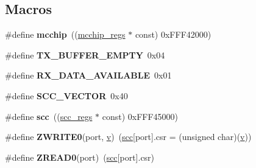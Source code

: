 \subsection*{Macros}
\begin{DoxyCompactItemize}
\item 
\mbox{\label{group__RTEMSBSPsM68kMVME162_gadb6901376d3135ebb6c13cdcbd141252}} 
\#define {\bfseries mcchip}~((\mbox{\hyperlink{structmcchip__regs}{mcchip\+\_\+regs}} $\ast$ const) 0x\+F\+F\+F42000)
\item 
\mbox{\label{group__RTEMSBSPsM68kMVME162_ga17ba25b8b713d14f21883e8e8c801075}} 
\#define {\bfseries T\+X\+\_\+\+B\+U\+F\+F\+E\+R\+\_\+\+E\+M\+P\+TY}~0x04
\item 
\mbox{\label{group__RTEMSBSPsM68kMVME162_ga2c89e28d132bac383f72403e1e62135b}} 
\#define {\bfseries R\+X\+\_\+\+D\+A\+T\+A\+\_\+\+A\+V\+A\+I\+L\+A\+B\+LE}~0x01
\item 
\mbox{\label{group__RTEMSBSPsM68kMVME162_ga3845de4996526e018ce7bfd88f92fbf9}} 
\#define {\bfseries S\+C\+C\+\_\+\+V\+E\+C\+T\+OR}~0x40
\item 
\mbox{\label{group__RTEMSBSPsM68kMVME162_gad654dc9ea6a06d25ae4b6fb1e9837d58}} 
\#define {\bfseries scc}~((\mbox{\hyperlink{structscc__regs}{scc\+\_\+regs}} $\ast$ const) 0x\+F\+F\+F45000)
\item 
\mbox{\label{group__RTEMSBSPsM68kMVME162_ga9ef71e83e17bec748aac1d3ac0f5b8b3}} 
\#define {\bfseries Z\+W\+R\+I\+T\+E0}(port,  \mbox{\hyperlink{sun4u_2tte_8h_a0b943bd7a9fc74d6635879a38dc16894}{v}})~(\mbox{\hyperlink{structscc}{scc}}\mbox{[}port\mbox{]}.csr = (unsigned char)(\mbox{\hyperlink{sun4u_2tte_8h_a0b943bd7a9fc74d6635879a38dc16894}{v}}))
\item 
\mbox{\label{group__RTEMSBSPsM68kMVME162_ga76a111faec20486a206937d336efe070}} 
\#define {\bfseries Z\+R\+E\+A\+D0}(port)~(\mbox{\hyperlink{structscc}{scc}}\mbox{[}port\mbox{]}.csr)
\item 
\mbox{\label{group__RTEMSBSPsM68kMVME162_gafac0abc0ead5ccf2bbcdf9333d3f7ef1}} 

\end{DoxyCompactItemize}

